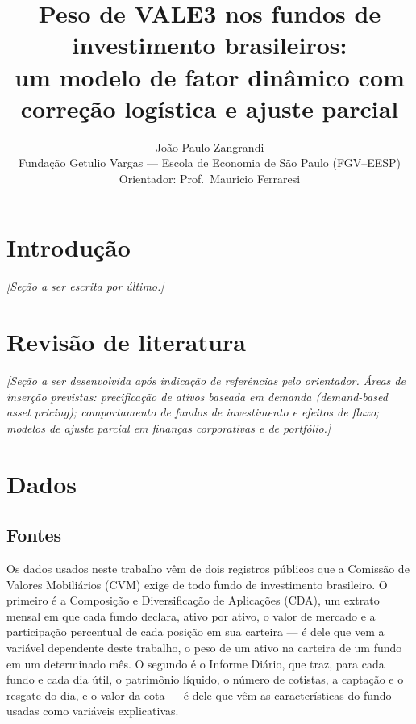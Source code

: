 \documentclass[11pt,a4paper]{article}
\title{Peso de VALE3 nos fundos de investimento brasileiros:\\
um modelo de fator dinâmico com correção logística e ajuste parcial}
\author{João Paulo Zangrandi\\
Fundação Getulio Vargas --- Escola de Economia de São Paulo (FGV--EESP)\\
Orientador: Prof.\ Mauricio Ferraresi}
\date{}
\begin{document}
\maketitle

\tableofcontents
\newpage

\section{Introdução}

\emph{[Seção a ser escrita por último.]}

\section{Revisão de literatura}

\emph{[Seção a ser desenvolvida após indicação de referências pelo orientador. Áreas de
inserção previstas: precificação de ativos baseada em demanda (\emph{demand-based asset
pricing}); comportamento de fundos de investimento e efeitos de fluxo; modelos de ajuste
parcial em finanças corporativas e de portfólio.]}

\section{Dados}
\label{sec:dados}

\FloatBarrier
\subsection{Fontes}

Os dados usados neste trabalho vêm de dois registros públicos que a Comissão de Valores
Mobiliários (CVM) exige de todo fundo de investimento brasileiro. O primeiro é a Composição e
Diversificação de Aplicações (CDA), um extrato mensal em que cada fundo declara, ativo por
ativo, o valor de mercado e a participação percentual de cada posição em sua carteira --- é
dele que vem a variável dependente deste trabalho, o peso de um ativo na carteira de um fundo
em um determinado mês. O segundo é o Informe Diário, que traz, para cada fundo e cada dia útil,
o patrimônio líquido, o número de cotistas, a captação e o resgate do dia, e o valor da cota
--- é dele que vêm as características do fundo usadas como variáveis explicativas.
\end{document}

